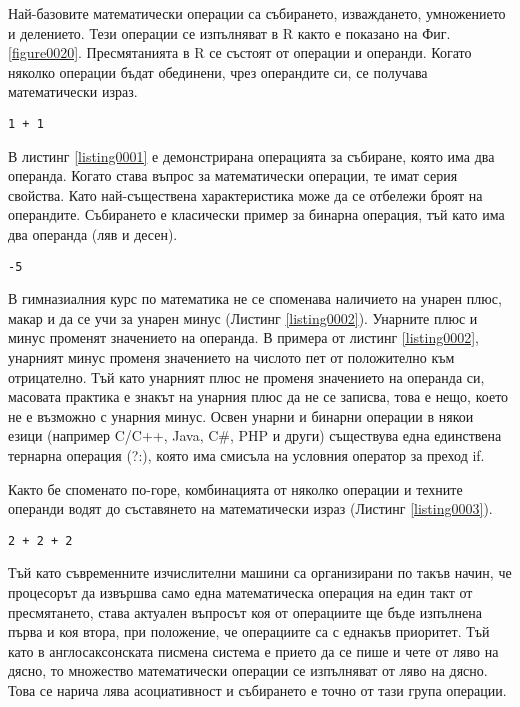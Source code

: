Най-базовите математически операции са събирането, изваждането, умножението и делението. Тези операции се изпълняват в R както е показано на Фиг. \ref{figure0020}. Пресмятанията в R се състоят от операции и операнди. Когато няколко операции бъдат обединени, чрез операндите си, се получава математически израз.

\begin{lstlisting}[caption=Събиране, label=listing0001]
1 + 1
\end{lstlisting}

В листинг \ref{listing0001} е демонстрирана операцията за събиране, която има два операнда. Когато става въпрос за математически операции, те имат серия свойства. Като най-съществена характеристика може да се отбележи броят на операндите. Събирането е класически пример за бинарна операция, тъй като има два операнда (ляв и десен).

\begin{lstlisting}[caption=Унарен минус, label=listing0002]
-5
\end{lstlisting}

В гимназиалния курс по математика не се споменава наличието на унарен плюс, макар и да се учи за унарен минус (Листинг \ref{listing0002}). Унарните плюс и минус променят значението на операнда. В примера от листинг \ref{listing0002}, унарният минус променя значението на числото пет от положително към отрицателно. Тъй като унарният плюс не променя значението на операнда си, масовата практика е знакът на унарния плюс да не се записва, това е нещо, което не е възможно с унарния минус. Освен унарни и бинарни операции в някои езици (например C/C++, Java, C\#, PHP и други) съществува една единствена тернарна операция (?:), която има смисъла на условния оператор за преход if.

Както бе споменато по-горе, комбинацията от няколко операции и техните операнди водят до съставянето на математически израз (Листинг \ref{listing0003}).

\begin{lstlisting}[caption=Аритметичен израз с две събирания, label=listing0003]
2 + 2 + 2
\end{lstlisting}

Тъй като съвременните изчислителни машини са организирани по такъв начин, че процесорът да извършва само една математическа операция на един такт от пресмятането, става актуален въпросът коя от операциите ще бъде изпълнена първа и коя втора, при положение, че операциите са с еднакъв приоритет. Тъй като в англосаксонската писмена система е прието да се пише и чете от ляво на дясно, то множество математически операции се изпълняват от ляво на дясно. Това се нарича лява асоциативност и събирането е точно от тази група операции.

